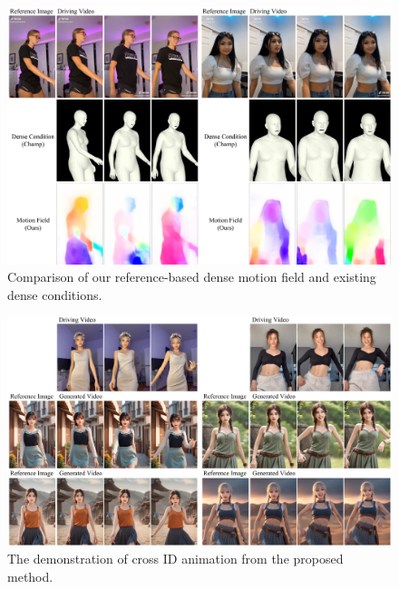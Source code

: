 \begin{figure}[t]
    \centering
    \includegraphics[width=1.0\columnwidth]{./image/exp4.pdf}
    \vspace{-20pt}
    \caption{Comparison of our reference-based dense motion field and existing dense conditions.}
    \label{fig: com_dense}
\end{figure}

\begin{figure}[t]
    \centering
    \includegraphics[width=1.0\columnwidth]{./image/exp3.pdf}
    \vspace{-20pt}
    \caption{The demonstration of cross ID animation from the proposed method.}
    \label{fig: cross_id}
\end{figure}
\vspace{-10pt}

